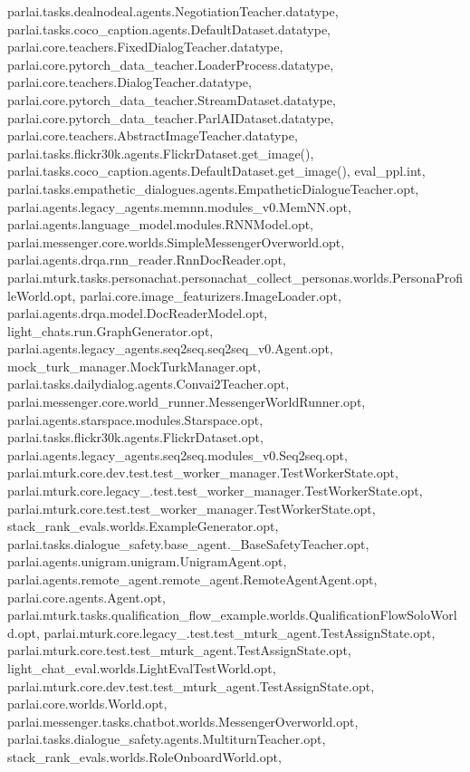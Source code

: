 parlai.\+tasks.\+dealnodeal.\+agents.\+Negotiation\+Teacher.\+datatype, parlai.\+tasks.\+coco\+\_\+caption.\+agents.\+Default\+Dataset.\+datatype, parlai.\+core.\+teachers.\+Fixed\+Dialog\+Teacher.\+datatype, parlai.\+core.\+pytorch\+\_\+data\+\_\+teacher.\+Loader\+Process.\+datatype, parlai.\+core.\+teachers.\+Dialog\+Teacher.\+datatype, parlai.\+core.\+pytorch\+\_\+data\+\_\+teacher.\+Stream\+Dataset.\+datatype, parlai.\+core.\+pytorch\+\_\+data\+\_\+teacher.\+Parl\+A\+I\+Dataset.\+datatype, parlai.\+core.\+teachers.\+Abstract\+Image\+Teacher.\+datatype, parlai.\+tasks.\+flickr30k.\+agents.\+Flickr\+Dataset.\+get\+\_\+image(), parlai.\+tasks.\+coco\+\_\+caption.\+agents.\+Default\+Dataset.\+get\+\_\+image(), eval\+\_\+ppl.\+int, parlai.\+tasks.\+empathetic\+\_\+dialogues.\+agents.\+Empathetic\+Dialogue\+Teacher.\+opt, parlai.\+agents.\+legacy\+\_\+agents.\+memnn.\+modules\+\_\+v0.\+Mem\+N\+N.\+opt, parlai.\+agents.\+language\+\_\+model.\+modules.\+R\+N\+N\+Model.\+opt, parlai.\+messenger.\+core.\+worlds.\+Simple\+Messenger\+Overworld.\+opt, parlai.\+agents.\+drqa.\+rnn\+\_\+reader.\+Rnn\+Doc\+Reader.\+opt, parlai.\+mturk.\+tasks.\+personachat.\+personachat\+\_\+collect\+\_\+personas.\+worlds.\+Persona\+Profile\+World.\+opt, parlai.\+core.\+image\+\_\+featurizers.\+Image\+Loader.\+opt, parlai.\+agents.\+drqa.\+model.\+Doc\+Reader\+Model.\+opt, light\+\_\+chats.\+run.\+Graph\+Generator.\+opt, parlai.\+agents.\+legacy\+\_\+agents.\+seq2seq.\+seq2seq\+\_\+v0.\+Agent.\+opt, mock\+\_\+turk\+\_\+manager.\+Mock\+Turk\+Manager.\+opt, parlai.\+tasks.\+dailydialog.\+agents.\+Convai2\+Teacher.\+opt, parlai.\+messenger.\+core.\+world\+\_\+runner.\+Messenger\+World\+Runner.\+opt, parlai.\+agents.\+starspace.\+modules.\+Starspace.\+opt, parlai.\+tasks.\+flickr30k.\+agents.\+Flickr\+Dataset.\+opt, parlai.\+agents.\+legacy\+\_\+agents.\+seq2seq.\+modules\+\_\+v0.\+Seq2seq.\+opt, parlai.\+mturk.\+core.\+dev.\+test.\+test\+\_\+worker\+\_\+manager.\+Test\+Worker\+State.\+opt, parlai.\+mturk.\+core.\+legacy\+\_.\+test.\+test\+\_\+worker\+\_\+manager.\+Test\+Worker\+State.\+opt, parlai.\+mturk.\+core.\+test.\+test\+\_\+worker\+\_\+manager.\+Test\+Worker\+State.\+opt, stack\+\_\+rank\+\_\+evals.\+worlds.\+Example\+Generator.\+opt, parlai.\+tasks.\+dialogue\+\_\+safety.\+base\+\_\+agent.\+\_\+\+Base\+Safety\+Teacher.\+opt, parlai.\+agents.\+unigram.\+unigram.\+Unigram\+Agent.\+opt, parlai.\+agents.\+remote\+\_\+agent.\+remote\+\_\+agent.\+Remote\+Agent\+Agent.\+opt, parlai.\+core.\+agents.\+Agent.\+opt, parlai.\+mturk.\+tasks.\+qualification\+\_\+flow\+\_\+example.\+worlds.\+Qualification\+Flow\+Solo\+World.\+opt, parlai.\+mturk.\+core.\+legacy\+\_.\+test.\+test\+\_\+mturk\+\_\+agent.\+Test\+Assign\+State.\+opt, parlai.\+mturk.\+core.\+test.\+test\+\_\+mturk\+\_\+agent.\+Test\+Assign\+State.\+opt, light\+\_\+chat\+\_\+eval.\+worlds.\+Light\+Eval\+Test\+World.\+opt, parlai.\+mturk.\+core.\+dev.\+test.\+test\+\_\+mturk\+\_\+agent.\+Test\+Assign\+State.\+opt, parlai.\+core.\+worlds.\+World.\+opt, parlai.\+messenger.\+tasks.\+chatbot.\+worlds.\+Messenger\+Overworld.\+opt, parlai.\+tasks.\+dialogue\+\_\+safety.\+agents.\+Multiturn\+Teacher.\+opt, stack\+\_\+rank\+\_\+evals.\+worlds.\+Role\+Onboard\+World.\+opt, 